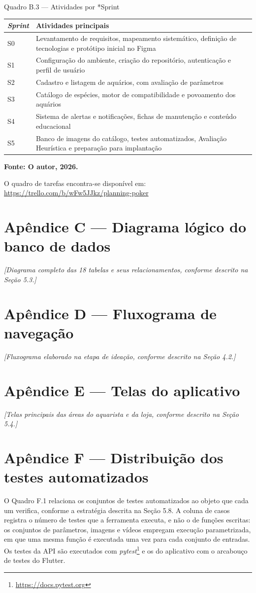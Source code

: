 \documentclass[12pt,oneside,a4paper,brazilian]{abntex2}
\newcommand{\legendaabnt}[1]{%
  \par\vspace{9pt}%
  \begingroup\centering\normalsize\SingleSpacing #1\par\endgroup
  \vspace{3pt}}
\newcommand{\fonteabnt}[1]{%
  \par\vspace{3pt}%
  \begingroup\centering\normalsize\SingleSpacing\bfseries #1\par\endgroup
  \vspace{9pt}}
\begin{document}
\legendaabnt{Quadro B.3 --- Atividades por *Sprint}
{\footnotesize\SingleSpacing
\setlength{\LTpre}{0pt}\setlength{\LTpost}{0pt}
\setlength{\extrarowheight}{3pt}
\begin{longtable}{|>{\raggedright\arraybackslash}p{1.2cm}|>{\raggedright\arraybackslash}p{13.4cm}|}
\hline
\textbf{\textit{Sprint}} & \textbf{Atividades principais} \\[2pt] \hline \endhead
S0 & Levantamento de requisitos, mapeamento sistemático, definição de tecnologias e protótipo inicial no Figma \\[2pt] \hline
S1 & Configuração do ambiente, criação do repositório, autenticação e perfil de usuário \\[2pt] \hline
S2 & Cadastro e listagem de aquários, com avaliação de parâmetros \\[2pt] \hline
S3 & Catálogo de espécies, motor de compatibilidade e povoamento dos aquários \\[2pt] \hline
S4 & Sistema de alertas e notificações, fichas de manutenção e conteúdo educacional \\[2pt] \hline
S5 & Banco de imagens do catálogo, testes automatizados, Avaliação Heurística e preparação para implantação \\[2pt] \hline
\end{longtable}}
\fonteabnt{Fonte: O autor, 2026.}
O quadro de tarefas encontra-se disponível em: \url{https://trello.com/b/wFw5JJkz/planning-poker}


\section*{Apêndice C --- Diagrama lógico do banco de dados}
\textit{[Diagrama completo das 18 tabelas e seus relacionamentos, conforme descrito na Seção 5.3.]}


\section*{Apêndice D --- Fluxograma de navegação}
\textit{[Fluxograma elaborado na etapa de ideação, conforme descrito na Seção 4.2.]}


\section*{Apêndice E --- Telas do aplicativo}
\textit{[Telas principais das áreas do aquarista e da loja, conforme descrito na Seção 5.4.]}


\section*{Apêndice F --- Distribuição dos testes automatizados}
O Quadro F.1 relaciona os conjuntos de testes automatizados ao objeto que cada um verifica, conforme a estratégia descrita na Seção 5.8. A coluna de casos registra o número de testes que a ferramenta executa, e não o de funções escritas: os conjuntos de parâmetros, imagens e vídeos empregam execução parametrizada, em que uma mesma função é executada uma vez para cada conjunto de entradas. Os testes da API são executados com \textit{pytest}\footnote{\url{https://docs.pytest.org}} e os do aplicativo com o arcabouço de testes do Flutter.
\end{document}
